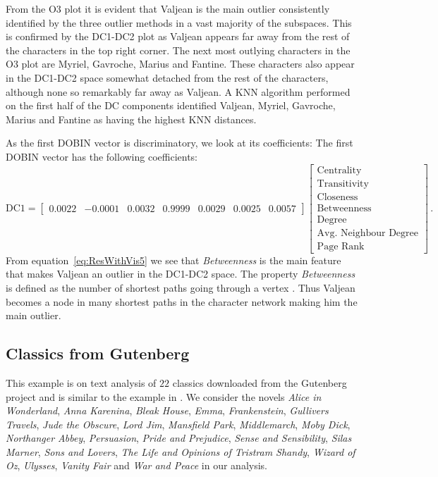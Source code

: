 \documentclass[a4paper,11pt]{article}
\begin{document}
From the O3 plot it is evident that Valjean is the main outlier consistently identified by the three outlier methods in a vast majority of the subspaces.  This is confirmed by the DC1-DC2 plot as Valjean appears far away from the rest of the characters in the top right corner.  The next most outlying characters in the O3 plot are Myriel, Gavroche, Marius and Fantine. These characters also appear in the DC1-DC2 space somewhat detached from the rest of the characters, although none so remarkably far away as Valjean. A KNN algorithm performed on the first half of the DC components identified Valjean, Myriel, Gavroche, Marius and Fantine as having the highest KNN distances.

As the first DOBIN vector is discriminatory, we look at its coefficients:
The first DOBIN vector has the following coefficients:
\begin{equation}\label{eq:ResWithVis5}
    \text{DC1} = \begin{bmatrix}
    0.0022 & -0.0001 &  0.0032 & 0.9999 & 0.0029 & 0.0025 & 0.0057
    \end{bmatrix}
    \begin{bmatrix}
    \text{Centrality} \\
    \text{Transitivity} \\
    \text{Closeness} \\
    \text{Betweenness} \\
    \text{Degree} \\
    \text{Avg. Neighbour Degree}\\
    \text{Page Rank}
    \end{bmatrix} \, .
\end{equation}
From equation~\eqref{eq:ResWithVis5} we see that \textit{Betweenness} is the main feature that makes Valjean an outlier in the DC1-DC2 space. The property \textit{Betweenness} is defined as the number of shortest paths going through a vertex \citep{igraph}. Thus Valjean becomes a node in many shortest paths in the character network making him the main outlier.

\subsection{Classics from Gutenberg}\label{sec:ResWithVis6}
This example is on text analysis of $22$ classics downloaded from the Gutenberg project \citep{gutenberg} and  is similar to the example in \cite{wilkinson2017visualizing}. We consider the novels \textit{Alice in Wonderland}, \textit{Anna Karenina}, \textit{Bleak House}, \textit{Emma}, \textit{Frankenstein}, \textit{Gullivers Travels}, \textit{Jude the Obscure}, \textit{Lord Jim}, \textit{Mansfield Park}, \textit{Middlemarch}, \textit{Moby Dick}, \textit{Northanger Abbey}, \textit{Persuasion}, \textit{Pride and Prejudice}, \textit{Sense and Sensibility}, \textit{Silas Marner}, \textit{Sons and Lovers}, \textit{The Life and Opinions of Tristram Shandy}, \textit{Wizard of Oz}, \textit{Ulysses}, \textit{Vanity Fair} and  \textit{War and Peace} in our analysis.
\end{document}
